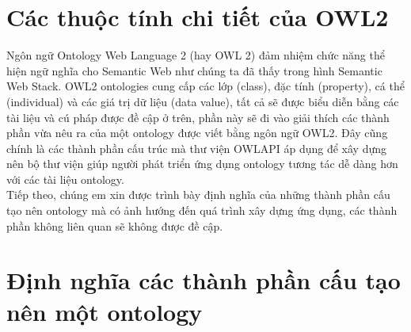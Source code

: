 \section{Các thuộc tính chi tiết của OWL2}
Ngôn ngữ Ontology Web Language 2 (hay OWL 2) đảm nhiệm chức năng thể hiện ngữ nghĩa cho Semantic Web như chúng ta đã thấy trong hình Semantic Web Stack. OWL2 ontologies cung cấp các lớp (class), đặc tính (property), cá thể (individual) và các giá trị dữ liệu (data value), tất cả sẽ được biểu diễn bằng các tài liệu và cú pháp được đề cập ở trên, phần này sẽ đi vào giải thích các thành phần vừa nêu ra của một ontology được viết bằng ngôn ngữ OWL2. Đây cũng chính là các thành phần cấu trúc mà thư viện OWLAPI \cite{owlapi} áp dụng để xây dựng nên bộ thư viện giúp người phát triển ứng dụng ontology tương tác dễ dàng hơn với các tài liệu ontology.
\\
Tiếp theo, chúng em xin được trình bày định nghĩa của những thành phần cấu tạo nên ontology mà có ảnh hướng đến quá trình xây dựng ứng dụng, các thành phần không liên quan sẽ không được đề cập.

\section{Định nghĩa các thành phần cấu tạo nên một ontology}
